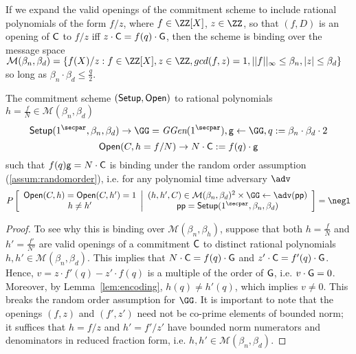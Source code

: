 If we expand the valid openings of the commitment scheme to include rational polynomials of the form $f/z$, where $f \in \ZZ[X]$, $z \in \ZZ$, so that $(f,D)$ is an opening of $\mathsf{C}$ to $f/z$ iff $z \cdot \mathsf{C} = f(q) \cdot \mathsf{G}$, then the scheme is binding over the message space $\mathcal{M}(\beta_n, \beta_d) =  \{f(X)/z: f \in \ZZ[X], z \in \ZZ, gcd(f,z) = 1, ||f||_\infty \leq \beta_n, |z| \leq \beta_d \}$ so long as $\beta_n \cdot \beta_d \leq \frac{q}{2}$. 

\begin{lemma}
	The commitment scheme $(\textsf{{Setup}},\textsf{{Open}})$ to rational polynomials $h=\frac{f}{N}\in \mathcal{M}(\beta_n,\beta_d)$ 
	$$\setup(1^\secpar,\beta_n,\beta_d)\rightarrow \GG=\ggen(1^\secpar) ,\Generator\gets \GG ,q:=\beta_n\cdot \beta_d\cdot 2$$
	$$\textsf{{Open}}(C,h=f/N)\rightarrow N\cdot \mathsf{C}:=f(q)\cdot \mathsf{g} $$ 
	such that $f(q)\mathsf{g}=N\cdot \mathsf{C}$ is binding under the random order assumption (\cref{assum:randomorder}), i.e. for any polynomial time adversary $\adv$ $$P\left[\begin{array}{c} 
	\open(C,h)=\open(C,h')=1\\
	h\neq h' 
\end{array}
 \middle|\begin{array}{c}
(h,h',C) \in \mathcal{M}(\beta_n,\beta_d)^2 \times \GG  \gets \adv(\crs)\\	
\crs=\setup(1^\secpar,\beta_n,\beta_d)
\end{array}
	 \right]=\negl$$
\end{lemma}
\begin{proof}
To see why this is binding over $\mathcal{M}(\beta_n, \beta_h)$, suppose that both $h=\frac{f}{N}$ and $h'=\frac{f'}{N'}$ are valid openings of a commitment $\mathsf{C}$ to distinct rational polynomials $h, h' \in \mathcal{M}(\beta_n, \beta_d)$. This implies that $N\cdot \mathsf{C} = f(q) \cdot \mathsf{G}$ and $z' \cdot \mathsf{C} = f'(q) \cdot \mathsf{G}$. Hence, $v =  z \cdot f'(q) - z' \cdot f(q)$ is a multiple of the order of $\mathsf{G}$, i.e. $v \cdot \mathsf{G} = 0$. Moreover, by Lemma~\ref{lem:encoding}, $h(q) \neq h'(q)$, which implies $v \neq 0$. This breaks the random order assumption for $\GG$. It is important to note that the openings $(f, z)$ and $(f', z')$ need not be co-prime elements of bounded norm; it suffices that $h = f/z$ and $h' = f'/z'$ have bounded norm numerators and denominators in reduced fraction form, i.e. $h, h' \in \mathcal{M}(\beta_n, \beta_d)$. 
\end{proof}



